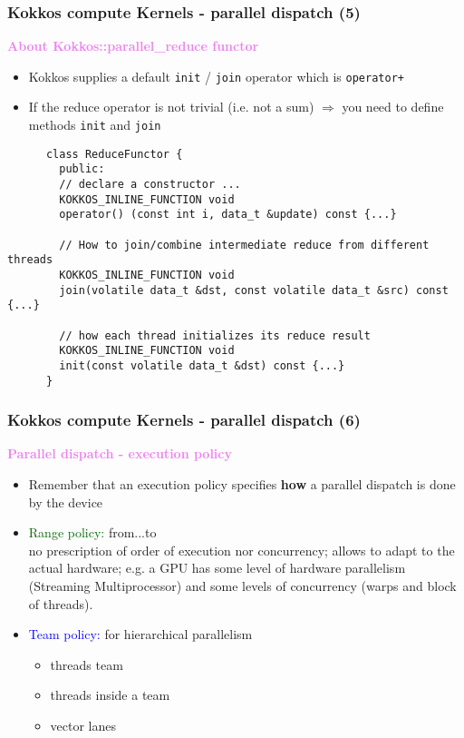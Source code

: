 \begin{frame}[fragile=singleslide]
  \frametitle{Kokkos compute Kernels - parallel dispatch (5)}

  {\large \textcolor{violet}{\textbf{About Kokkos::parallel\_reduce functor}}}

  \begin{itemize}
  \item Kokkos supplies a default \texttt{init} / \texttt{join} operator which is \texttt{operator+}
  \item If the reduce operator is not trivial (i.e. not a sum) $\Rightarrow$ you need to define methods \texttt{init} and \texttt{join}
  \end{itemize}

  {\small
    \begin{verbatim}
      class ReduceFunctor {
        public:
        // declare a constructor ...
        KOKKOS_INLINE_FUNCTION void 
        operator() (const int i, data_t &update) const {...}

        // How to join/combine intermediate reduce from different threads
        KOKKOS_INLINE_FUNCTION void 
        join(volatile data_t &dst, const volatile data_t &src) const {...}

        // how each thread initializes its reduce result
        KOKKOS_INLINE_FUNCTION void 
        init(const volatile data_t &dst) const {...}
      }
      \end{verbatim}
    }
\end{frame}

\begin{frame}[fragile=singleslide]
  \frametitle{Kokkos compute Kernels - parallel dispatch (6)}
  
  {\Large \textcolor{violet}{\textbf{Parallel dispatch - execution policy}}}

  \begin{itemize}
  \item Remember that an execution policy specifies \textbf{how} a parallel dispatch is done by the device
  \item \textcolor{darkgreen}{Range policy:} from...to\\
    no prescription of order of execution nor concurrency; allows to adapt to the actual hardware; e.g. a GPU has some level of hardware parallelism (Streaming Multiprocessor) and some levels of concurrency (warps and block of threads).
  \item \textcolor{blue}{Team policy:} for hierarchical parallelism
    \begin{itemize}
    \item threads team $$
    \item threads inside a team
    \item vector lanes
    \end{itemize}
  \end{itemize}

\end{frame}


